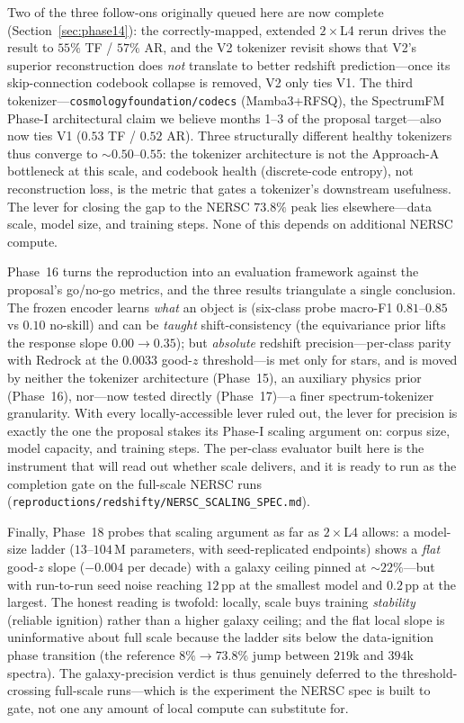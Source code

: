 \documentclass[11pt,letterpaper]{article}
\begin{document}
Two of the three follow-ons originally queued here are now complete
(Section~\ref{sec:phase14}): the correctly-mapped, extended
$2{\times}$L4 rerun drives the result to $55\%$ TF / $57\%$ AR, and the
V2 tokenizer revisit shows that V2's superior reconstruction does
\emph{not} translate to better redshift prediction---once its
skip-connection codebook collapse is removed, V2 only ties V1. The third
tokenizer---\texttt{cosmologyfoundation/codecs} (Mamba3+RFSQ), the SpectrumFM
Phase-I architectural claim we believe months 1--3 of the proposal target---also
now ties V1 ($0.53$ TF / $0.52$ AR). Three structurally different healthy
tokenizers thus converge to ${\sim}0.50$--$0.55$: the tokenizer architecture is
not the Approach-A bottleneck at this scale, and codebook health (discrete-code
entropy), not reconstruction loss, is the metric that gates a tokenizer's
downstream usefulness. The lever for closing the gap to the NERSC $73.8\%$ peak
lies elsewhere---data scale, model size, and training steps. None of this
depends on additional NERSC compute.

Phase~16 turns the reproduction into an evaluation framework against the
proposal's go/no-go metrics, and the three results triangulate a single
conclusion. The frozen encoder learns \emph{what} an object is (six-class probe
macro-F1 $0.81$--$0.85$ vs $0.10$ no-skill) and can be \emph{taught}
shift-consistency (the equivariance prior lifts the response slope $0.00 \to
0.35$); but \emph{absolute} redshift precision---per-class parity with Redrock
at the $0.0033$ good-$z$ threshold---is met only for stars, and is moved by
neither the tokenizer architecture (Phase~15), an auxiliary physics prior
(Phase~16), nor---now tested directly (Phase~17)---a finer spectrum-tokenizer
granularity. With every locally-accessible lever ruled out, the lever for
precision is exactly the one the proposal stakes its Phase-I scaling argument on:
corpus size, model capacity, and training steps. The per-class evaluator built
here is the instrument that will read out whether scale delivers, and it is ready
to run as the completion gate on the full-scale NERSC runs
(\texttt{reproductions/redshifty/NERSC\_SCALING\_SPEC.md}).

Finally, Phase~18 probes that scaling argument as far as $2{\times}$L4 allows: a
model-size ladder ($13$--$104$\,M parameters, with seed-replicated endpoints)
shows a \emph{flat} good-$z$ slope ($-0.004$ per decade) with a galaxy ceiling
pinned at ${\sim}22\%$---but with run-to-run seed noise reaching $12$\,pp at the
smallest model and $0.2$\,pp at the largest. The honest reading is twofold:
locally, scale buys training \emph{stability} (reliable ignition) rather than a
higher galaxy ceiling; and the flat local slope is uninformative about full
scale because the ladder sits below the data-ignition phase transition (the
reference $8\%\!\to\!73.8\%$ jump between $219$k and $394$k spectra). The
galaxy-precision verdict is thus genuinely deferred to the threshold-crossing
full-scale runs---which is the experiment the NERSC spec is built to gate, not
one any amount of local compute can substitute for.



\end{document}
